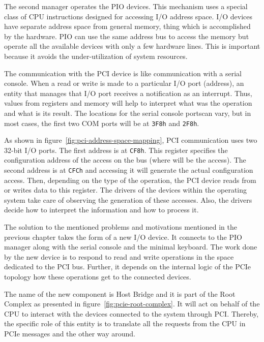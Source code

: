 \documentclass[12pt, a4paper]{report}
\begin{document}
The second manager operates the PIO devices. This mechanism uses a special class of CPU instructions designed for accessing I/O address space. I/O devices have separate address space from general memory, thing which is accomplished by the hardware. PIO can use the same address bus to access the memory but operate all the available devices with only a few hardware lines. This is important because it avoids the under-utilization of system resources.

The communication with the PCI device is like communication with a serial console.  When a read or write is made to a particular I/O port (address), an entity that manages that I/O port receives a notification as an interrupt. Thus, values from registers and memory will help to interpret what was the operation and what is its result. The locations for the serial console ports\footnotemark can vary, but in most cases, the first two COM ports will be at \texttt{3F8h} and \texttt{2F8h}.

As shown in figure~\ref{fig:pci-address-space-mapping}, PCI communication uses two 32-bit I/O ports. The first address is at \texttt{CF8h}. This register specifies the configuration address of the access on the bus (where will be the access). The second address is at \texttt{CFCh} and accessing it will generate the actual configuration access. Then, depending on the type of the operation, the PCI device reads from or writes data to this register. The drivers of the devices within the operating system take care of observing the generation of these accesses. Also, the drivers decide how to interpret the information and how to process it.

The solution to the mentioned problems and motivations mentioned in the previous chapter takes the form of a new I/O device. It connects to the PIO manager along with the serial console and the minimal keyboard. The work done by the new device is to respond to read and write operations in the space dedicated to the PCI bus. Further, it depends on the internal logic of the PCIe topology how these operations get to the connected devices.

The name of the new component is Host Bridge and it is part of the Root Complex as presented in figure~\ref{fig:pcie-root-complex}. It will act on behalf of the CPU to interact with the devices connected to the system through PCI. Thereby, the specific role of this entity is to translate all the requests from the CPU in PCIe messages and the other way around.
\end{document}
